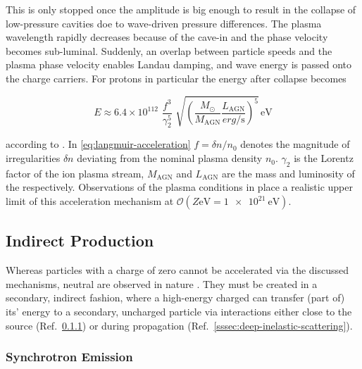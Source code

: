 This is only stopped once the amplitude is big enough to result in the collapse
of low-pressure cavities doe to wave-driven pressure differences. The plasma 
wavelength rapidly decreases because of the cave-in and the phase velocity 
becomes sub-luminal. Suddenly, an overlap between particle speeds and the 
plasma phase velocity enables Landau damping, and wave energy is passed onto 
the charge carriers. For protons in particular the energy after collapse 
becomes

\begin{equation}
	\label{eq:langmuir-acceleration}
	E \approx 6.4\times10^{112}\,\, \frac{f^3}{\gamma_2^5} \,\,
	\sqrt{\left(
		\frac{M_\odot}{M_\mathrm{AGN}}
		\frac{L_\mathrm{AGN}}{\unit{erg\per\second}} 
	      \right)^5}\,\mathrm{eV}
\end{equation}

according to \cite{osmanovExtremelyEfficientZevatron2014}. In 
\cref{eq:langmuir-acceleration} $f=\delta n/n_0$ denotes the magnitude of 
irregularities $\delta n$ deviating from the nominal plasma density $n_0$. 
$\gamma_2$ is the Lorentz factor of the ion plasma stream, $M_\mathrm{AGN}$ and
$L_\mathrm{AGN}$ are the mass and luminosity of the \AGN respectively. 
Observations of the plasma conditions in \AGNs place a realistic upper limit
of this acceleration mechanism at 
$\mathcal{O}(\unit{Z\eV} = \SI{1e21}{\eV})$.

\subsection{Indirect Production}
\label{ssec:indirect-production}

Whereas particles with a charge of zero cannot be accelerated via the discussed
mechanisms, neutral \CRs are observed in nature 
\cite{lhaasocollaborationUltrahighenergyRayBubble2024,
aielloObservationUltrahighenergyCosmic2025}. They must be created in a 
secondary, indirect fashion, where a high-energy charged \CR can transfer 
(part of) its' energy to a secondary, uncharged particle via interactions 
either close to the source (Ref.\ \cref{sssec:synchrotron-emission}) or during 
propagation (Ref.\ \cref{sssec:deep-inelastic-scattering}).

\subsubsection{Synchrotron Emission}
\label{sssec:synchrotron-emission}

